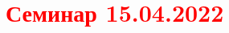 \documentclass[main.tex]{subfiles}
\begin{document}
\section{\textcolor{red}{Семинар 15.04.2022}}
\end{document}
